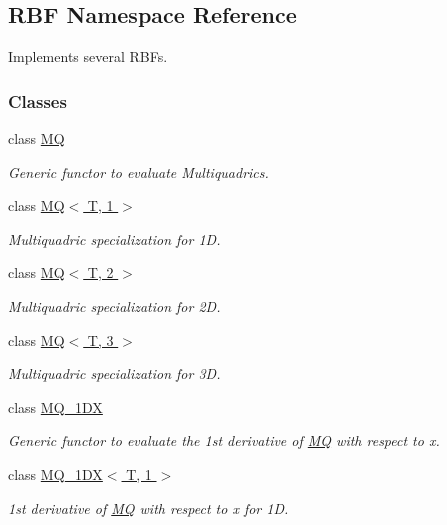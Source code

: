 \hypertarget{namespaceRBF}{
\subsection{RBF Namespace Reference}
\label{namespaceRBF}
}
Implements several RBFs.  


\subsubsection*{Classes}
\begin{CompactItemize}
\item 
class \hyperlink{classRBF_1_1MQ}{MQ}
\begin{CompactList}\small\item\em Generic functor to evaluate Multiquadrics. \item\end{CompactList}\item 
class \hyperlink{classRBF_1_1MQ_3_01T_00_011_01_4}{MQ$<$ T, 1 $>$}
\begin{CompactList}\small\item\em Multiquadric specialization for 1D. \item\end{CompactList}\item 
class \hyperlink{classRBF_1_1MQ_3_01T_00_012_01_4}{MQ$<$ T, 2 $>$}
\begin{CompactList}\small\item\em Multiquadric specialization for 2D. \item\end{CompactList}\item 
class \hyperlink{classRBF_1_1MQ_3_01T_00_013_01_4}{MQ$<$ T, 3 $>$}
\begin{CompactList}\small\item\em Multiquadric specialization for 3D. \item\end{CompactList}\item 
class \hyperlink{classRBF_1_1MQ__1DX}{MQ\_\-1DX}
\begin{CompactList}\small\item\em Generic functor to evaluate the 1st derivative of \hyperlink{classRBF_1_1MQ}{MQ} with respect to x. \item\end{CompactList}\item 
class \hyperlink{classRBF_1_1MQ__1DX_3_01T_00_011_01_4}{MQ\_\-1DX$<$ T, 1 $>$}
\begin{CompactList}\small\item\em 1st derivative of \hyperlink{classRBF_1_1MQ}{MQ} with respect to x for 1D. \item\end{CompactList}\item 

\end{CompactItemize}
